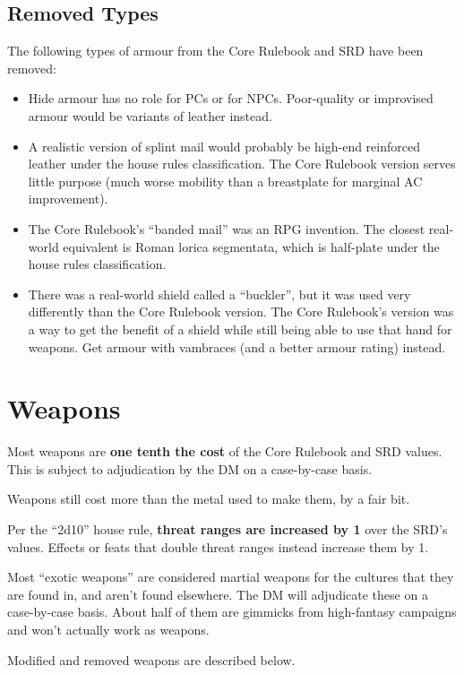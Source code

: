 %
\subsection{Removed Types}

The following types of armour from the Core Rulebook and SRD have been
removed:

\begin{itemize}
%
\item Hide armour has no role for PCs or for NPCs. Poor-quality or
improvised armour would be variants of leather instead.
%
\item A realistic version of splint mail would probably be high-end
reinforced leather under the house rules classification. The Core Rulebook
version serves little purpose (much worse mobility than a breastplate for
marginal AC improvement).
%
\item The Core Rulebook's ``banded mail'' was an RPG invention. The closest
real-world equivalent is Roman lorica segmentata, which is half-plate under
the house rules classification.
%
\item There was a real-world shield called a ``buckler'', but it was used
very differently than the Core Rulebook version. The Core Rulebook's
version was a way to get the benefit of a shield while still being able to
use that hand for weapons. Get armour with vambraces (and a better armour
rating) instead.
%
\end{itemize}
%

%
%
\section{Weapons}

Most weapons are \textbf{one tenth the cost} of the Core Rulebook and SRD
values. This is subject to adjudication by the DM on a case-by-case basis.

Weapons still cost more than the metal used to make them, by a fair bit.

Per the ``2d10'' house rule, \textbf{threat ranges are increased by 1}
over the SRD's values. Effects or feats that double threat ranges instead
increase them by 1.

Most ``exotic weapons'' are considered martial weapons for the cultures
that they are found in, and aren't found elsewhere. The DM will adjudicate
these on a case-by-case basis. About half of them are gimmicks from
high-fantasy campaigns and won't actually work as weapons.

Modified and removed weapons are described below.

